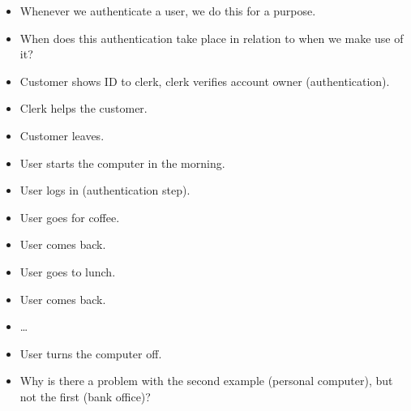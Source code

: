 \begin{frame}
  \begin{remark}
    \begin{itemize}
      \item Whenever we authenticate a user, we do this for a purpose.

      \item When does this authentication take place in relation to when we make 
        use of it?
    \end{itemize}
  \end{remark}
\end{frame}

\begin{frame}
  \begin{example}
    \begin{itemize}
      \item Customer shows ID to clerk, clerk verifies account owner 
        (authentication).
      \item Clerk helps the customer.
      \item Customer leaves.
    \end{itemize}
  \end{example}
\end{frame}

\begin{frame}
  \begin{example}
    \begin{itemize}
      \item User starts the computer in the morning.
      \item User logs in (authentication step).
      \item User goes for coffee.
      \item User comes back.
      \item User goes to lunch.
      \item User comes back.
      \item \dots
      \item User turns the computer off.
    \end{itemize}
  \end{example}
\end{frame}

\begin{frame}
  \begin{exercise}
    \begin{itemize}
      \item Why is there a problem with the second example (personal computer), 
        but not the first (bank office)?
    \end{itemize}
  \end{exercise}
\end{frame}

